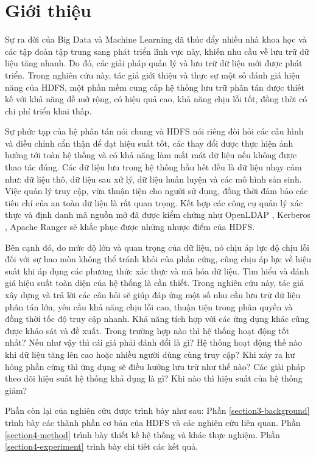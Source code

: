 \section{Giới thiệu}

Sự ra đời của Big Data và Machine Learning đã thúc đẩy nhiều nhà khoa học và các tập đoàn tập trung sang phát triển lĩnh vực này, khiến nhu cầu về lưu trữ dữ liệu tăng nhanh. Do đó, các giải pháp quản lý và lưu trữ dữ liệu mới được phát triển. Trong nghiên cứu này, tác giả giới thiệu và thực sự một số đánh giá hiệu năng của HDFS\cite{borthakur2007hadoop}, một phần mềm cung cấp hệ thống lưu trữ phân tán được thiết kế với khả năng dễ mở rộng, có hiệu quả cao, khả năng chịu lỗi tốt, đồng thời có chi phí triển khai thấp. 

Sự phức tạp của hệ phân tán nói chung và HDFS nói riêng đòi hỏi các cấu hình và điều chỉnh cẩn thận để đạt hiệu suất tốt, các thay đổi được thực hiện ảnh hưởng tới toàn hệ thống và có khả năng làm mất mát dữ liệu nếu không được thao tác đúng. Các dữ liệu lưu trong hệ thống hầu hết đều là dữ liệu nhạy cảm như: dữ liệu thô, dữ liệu sau xử lý, dữ liệu huấn luyện và các mô hình sản sinh. Việc quản lý truy cập, vừa thuận tiện cho người sử dụng, đồng thời đảm bảo các tiêu chí của an toàn dữ liệu là rất quan trọng. Kết hợp các công cụ quản lý xác thực và định danh mã nguồn mở đã được kiểm chứng như  OpenLDAP \cite{openLdap}, Kerberos \cite{bellovin1990limitations}, Apache Ranger \cite{ApacheRanger} sẽ khắc phục được những nhược điểm của HDFS.

Bên cạnh đó, do mức độ lớn và quan trọng của dữ liệu, nó chịu áp lực độ chịu lỗi đối với sự hao mòn không thể tránh khỏi của phần cứng, cũng chịu áp lực về hiệu suất khi áp dụng các phương thức xác thực và mã hóa dữ liệu. Tìm hiểu và đánh giá hiệu suất toàn diện của hệ thống là cần thiết. Trong nghiên cứu này, tác giả xây dựng và trả lời các câu hỏi sẽ giúp đáp ứng một số nhu cầu lưu trữ dữ liệu phân tán lớn, yêu cầu khả năng chịu lỗi cao, thuận tiện trong phân quyền và đồng thời tốc độ truy cập nhanh. Khả năng tích hợp với các ứng dụng khác cũng được khảo sát và đề xuất. Trong trường hợp nào thì hệ thống hoạt động tốt nhất? Nếu như vậy thì cái giá phải đánh đổi là gì? Hệ thống hoạt động thế nào khi dữ liệu tăng lên cao hoặc nhiều người dùng cùng truy cập? Khi xảy ra hư hỏng phần cứng thì ứng dụng sẽ điều hướng lưu trữ như thế nào? Các giải pháp theo dõi hiệu suất hệ thống khả dụng là gì? Khi nào thì hiệu suất của hệ thống giảm?

Phần còn lại của nghiên cứu được trình bày như sau: Phần \ref{section3-background} trình bày các thành phần cơ bản của HDFS và các nghiên cứu liên quan. Phần \ref{section4-method} trình bày thiết kế hệ thống và khác thực nghiệm. Phần \ref{section4-experiment} trình bày chi tiết các kết quả. 
